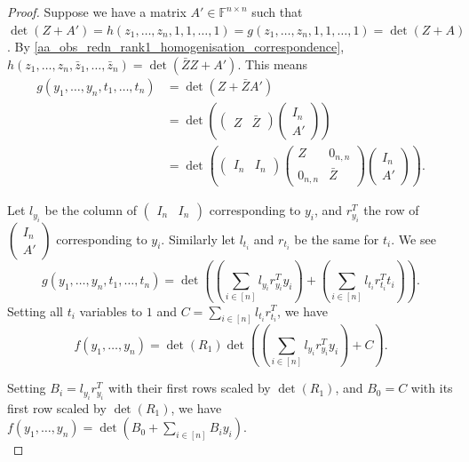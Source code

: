 \documentclass[11pt,letterpaper]{article}
\newcommand{\F}{\mathbb{F}}
\begin{document}
{{{\begin{proof}
Suppose we have a matrix $A' \in \F^{n\times n}$ such that $\det(Z + A') = h(z_1, \dots, z_n, 1, 1, \dots, 1) = g(z_1, \dots, z_n, 1, 1, \dots, 1) = \det(Z + A)$. By \cref{aa_obs_redn_rank1_homogenisation_correspondence}, $h(z_1,\dots,z_n,\bar{z}_1,\dots,\bar{z}_n) = \det(\bar{Z}Z + A')$. This means
\begin{align*}
    g(y_1, \dots, y_n, t_1, \dots, t_n) &= \det\left(Z + \bar{Z}A'\right) \\
        &= \det\left(\begin{pmatrix}Z & \bar{Z}\end{pmatrix}\begin{pmatrix}I_n \\ A'\end{pmatrix}\right) \\
        &= \det\left(\begin{pmatrix}I_n & I_n\end{pmatrix}\begin{pmatrix}Z & 0_{n,n} \\ 0_{n,n} & \bar{Z}\end{pmatrix} \begin{pmatrix}I_n \\ A'\end{pmatrix}\right)\text{.}
\end{align*}

Let $l_{y_i}$ be the column of $\begin{pmatrix}I_n & I_n\end{pmatrix}$ corresponding to $y_i$, and $r_{y_i}^T$ the row of $\begin{pmatrix}I_n \\ A'\end{pmatrix}$ corresponding to $y_i$. Similarly let $l_{t_i}$ and $r_{t_i}$ be the same for $t_i$. We see \[g(y_1, \dots, y_n, t_1, \dots, t_n) = \det \left( \left(\sum_{i \in [n]} l_{y_i}r_{y_i}^T y_i\right) + \left(\sum_{i \in [n]} l_{t_i}r_{t_i}^T t_{i}\right)\right)\text{.}\] Setting all $t_i$ variables to $1$ and $C = \sum_{i \in [n]} l_{t_i}r_{t_i}^T$, we have \[f(y_1, \dots, y_n) = \det(R_1) \det \left( \left(\sum_{i \in [n]} l_{y_i}r_{y_i}^T y_i\right) + C\right)\text{.}\]

Setting $B_i = l_{y_i}r_{y_i}^T$ with their first rows scaled by $\det(R_1)$, and $B_0 = C$ with its first row scaled by $\det(R_1)$, we have $f(y_1,\dots,y_n) = \det(B_0 + \sum_{i \in [n]} B_iy_i)$. \\
\end{proof}

}}}
\end{document}
